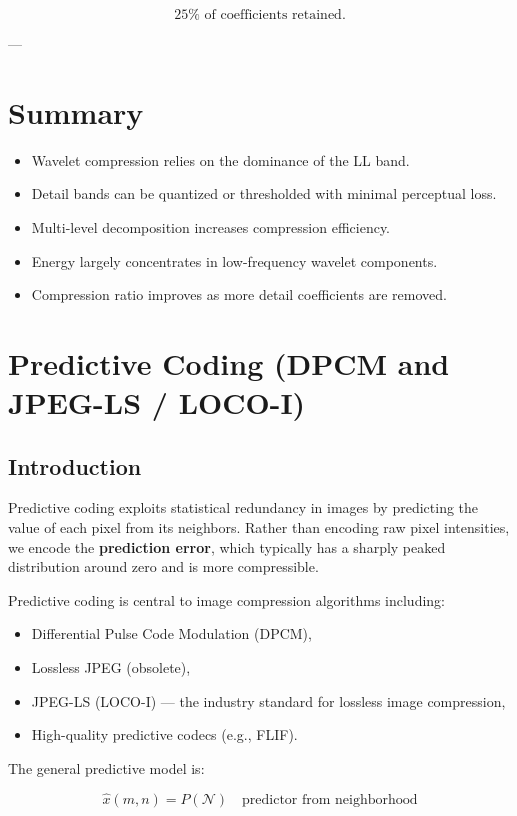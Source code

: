 \documentclass{AnantDocumentation}
\begin{document}
\[
\boxed{25\% \text{ of coefficients retained.}}
\]

---

\section*{Summary}

\begin{itemize}
\item Wavelet compression relies on the dominance of the LL band.
\item Detail bands can be quantized or thresholded with minimal perceptual loss.
\item Multi-level decomposition increases compression efficiency.
\item Energy largely concentrates in low-frequency wavelet components.
\item Compression ratio improves as more detail coefficients are removed.
\end{itemize}

\section{Predictive Coding (DPCM and JPEG-LS / LOCO-I)}

\subsection{Introduction}

Predictive coding exploits statistical redundancy in images by predicting the value of each pixel from its neighbors.  
Rather than encoding raw pixel intensities, we encode the \textbf{prediction error}, which typically has a sharply peaked distribution around zero and is more compressible.

Predictive coding is central to image compression algorithms including:
\begin{itemize}
\item Differential Pulse Code Modulation (DPCM),
\item Lossless JPEG (obsolete),
\item JPEG-LS (LOCO-I) --- the industry standard for lossless image compression,
\item High-quality predictive codecs (e.g., FLIF).
\end{itemize}

The general predictive model is:

\[
\hat{x}(m,n) = P(\mathcal{N})  \quad \text{predictor from neighborhood}
\]
\end{document}

